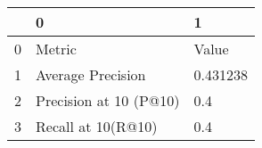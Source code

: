\begin{tabular}{lll}
\toprule
{} &                       0 &         1 \\
\midrule
0 &                  Metric &     Value \\
1 &       Average Precision &  0.431238 \\
2 &  Precision at 10 (P@10) &       0.4 \\
3 &      Recall at 10(R@10) &       0.4 \\
\bottomrule
\end{tabular}
